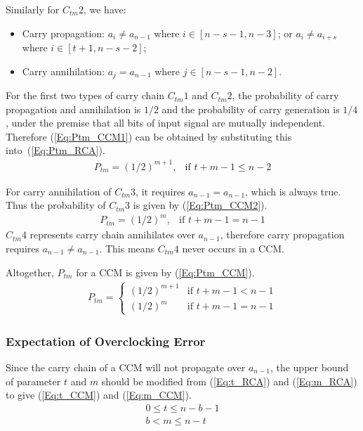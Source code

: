 \documentclass[prodmode,acmtrets]{acmsmall} %
\begin{document}
Similarly for $C_{tm}2$, we have:

\begin{itemize}
  \item Carry propagation: $a_i\neq a_{n-1}$ where $i\in[n-s-1,n-3]$; or $a_i\neq a_{i+s}$ where $i\in[t+1,n-s-2]$;
  \item Carry annihilation: $a_j=a_{n-1}$ where $j\in[n-s-1,n-2]$.
\end{itemize}

For the first two types of carry chain $C_{tm}1$ and $C_{tm}2$, the probability of carry propagation and annihilation is $1/2$ and the probability of carry generation is $1/4$, under the premise that all bits of input signal are mutually independent. Therefore (\ref{Eq:Ptm_CCM1}) can be obtained by substituting this into~(\ref{Eq:Ptm_RCA}).
%
\begin{eqnarray}\label{Eq:Ptm_CCM1}
  P_{tm}=\left(1/2\right)^{m+1}, & \textrm{if $t+m-1\leqslant n-2$}
\end{eqnarray}

For carry annihilation of $C_{tm}3$, it requires $a_{n-1}=a_{n-1}$, which is always true. Thus the probability of $C_{tm}3$ is given by (\ref{Eq:Ptm_CCM2}).
%
\begin{eqnarray}\label{Eq:Ptm_CCM2}
  P_{tm}=\left(1/2\right)^m, & \textrm{if $t+m-1=n-1$}
\end{eqnarray}
$C_{tm}4$ represents carry chain annihilates over $a_{n-1}$, therefore carry propagation requires $a_{n-1}\neq a_{n-1}$. This means $C_{tm}4$ never occurs in a CCM.

Altogether, $P_{tm}$ for a CCM is given by (\ref{Eq:Ptm_CCM}).
%
\begin{eqnarray}\label{Eq:Ptm_CCM}
  P_{tm}=\left\{\begin{array}{ll}
      (1/2)^{m+1} & \textrm{if $t+m-1<n-1$}\\
      (1/2)^{m} & \textrm{if $t+m-1=n-1$}
    \end{array} \right.
\end{eqnarray}

\subsubsection{Expectation of Overclocking Error}
Since the carry chain of a CCM will not propagate over $a_{n-1}$, the upper bound of parameter $t$ and $m$ should be modified from (\ref{Eq:t_RCA}) and (\ref{Eq:m_RCA}) to give (\ref{Eq:t_CCM}) and (\ref{Eq:m_CCM}).
%
\begin{eqnarray}
  \label{Eq:t_CCM} 0\leqslant t\leqslant n-b-1\\
  \label{Eq:m_CCM} b<m\leqslant n-t
\end{eqnarray}
\end{document}
